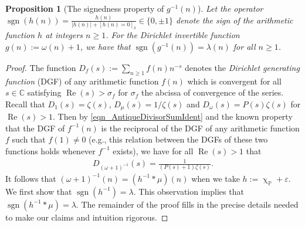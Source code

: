 \documentclass[11pt,reqno,a4letter]{article}
\numberwithin{figure}{section}
\numberwithin{table}{section}
\newcommand{\Iverson}[1]{\ensuremath{\left[#1\right]_{\delta}}}
\renewcommand{\chi}{\upchi}
\theoremstyle{plain}
\newtheorem{prop}[theorem]{Proposition}
\numberwithin{theorem}{section}
\theoremstyle{definition}
\newcommand{\NBRef}[1]{}
\renewcommand{\Re}{\operatorname{Re}}
\begin{document}
\begin{prop}[The signedness property of $g^{-1}(n)$]
\label{prop_SignageDirInvsOfPosBddArithmeticFuncs_v1} 
Let the operator 
$\operatorname{sgn}(h(n)) = \frac{h(n)}{|h(n)| + \Iverson{h(n) = 0}} \in \{0, \pm 1\}$ denote the sign 
of the arithmetic function $h$ at integers $n \geq 1$. 
For the Dirichlet invertible function $g(n) := \omega(n) + 1$, 
we have that $\operatorname{sgn}(g^{-1}(n)) = \lambda(n)$ for all $n \geq 1$. 
\NBRef{A02-2020-04-26}
\end{prop} 
\begin{proof} 
The function $D_f(s) := \sum_{n \geq 1} f(n) n^{-s}$ denotes the 
\emph{Dirichlet generating function} (DGF) of any 
arithmetic function $f(n)$ which is convergent for all $s \in \mathbb{C}$ satisfying 
$\Re(s) > \sigma_f$ for $\sigma_f$ the abcissa of convergence of the series. 
Recall that $D_1(s) = \zeta(s)$, $D_{\mu}(s) = 1 / \zeta(s)$ and $D_{\omega}(s) = P(s) \zeta(s)$ for 
$\Re(s) > 1$. 
Then by \eqref{eqn_AntiqueDivisorSumIdent} and the known property that the DGF of $f^{-1}(n)$ is 
the reciprocal of the DGF of any arithmetic function $f$ such that $f(1) \neq 0$ 
(e.g., this relation between the DGFs of these two functions holds whenever $f^{-1}$ exists), 
we have for all $\Re(s) > 1$ that 
\begin{align} 
\label{eqn_DGF_of_gInvn} 
D_{(\omega+1)^{-1}}(s) = \frac{1}{(P(s)+1) \zeta(s)}. 
\end{align} 
It follows that $(\omega + 1)^{-1}(n) = (h^{-1} \ast \mu)(n)$ when we take 
$h := \chi_{\mathbb{P}} + \varepsilon$. 
We first show that $\operatorname{sgn}(h^{-1}) = \lambda$. 
This observation implies 
that $\operatorname{sgn}(h^{-1} \ast \mu) = \lambda$. The remainder of the proof fills in the 
precise details needed to make our claims and intuition rigorous. 


\end{proof}
\end{document}
